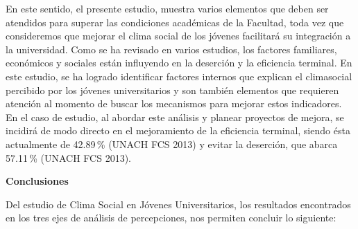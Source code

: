  
En este sentido, el presente estudio, muestra varios elementos que deben ser
atendidos para superar las condiciones académicas de la Facultad, toda vez
que consideremos que mejorar el clima social de los jóvenes facilitará su
integración a la universidad. Como se ha revisado en varios estudios, los
factores familiares, económicos y sociales están influyendo en la deserción
y la eficiencia terminal. En este estudio, se ha logrado identificar
factores internos que explican el clima\linebreak social percibido por los jóvenes
universitarios y son también elementos que requieren atención al momento de
buscar los mecanismos para mejorar estos indicadores. En el caso de
estudio, al abordar este análisis y planear proyectos de mejora, se
incidirá de modo directo en el mejoramiento de la eficiencia terminal,
siendo ésta actualmente de 42.89\,\% (UNACH FCS 2013) y evitar la
deserción, que abarca 57.11\,\% (UNACH FCS 2013).


\bigskip
\textbf{Conclusiones}
 
Del estudio de Clima Social en Jóvenes Universitarios, los resultados
encontrados en los tres ejes de análisis de percepciones, nos permiten
concluir lo siguiente:

